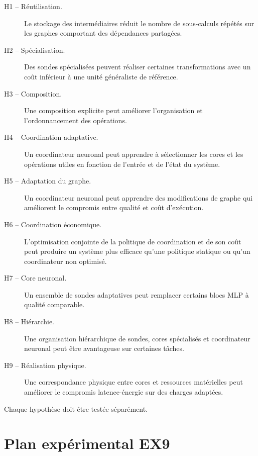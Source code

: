 \documentclass[11pt,a4paper]{article}
\begin{document}
\begin{description}

  \item[H1 -- Réutilisation.]
  Le stockage des intermédiaires réduit le nombre de sous-calculs
  répétés sur les graphes comportant des dépendances partagées.

  \item[H2 -- Spécialisation.]
  Des sondes spécialisées peuvent réaliser certaines transformations
  avec un coût inférieur à une unité généraliste de référence.

  \item[H3 -- Composition.]
  Une composition explicite peut améliorer l'organisation et
  l'ordonnancement des opérations.

  \item[H4 -- Coordination adaptative.]
  Un coordinateur neuronal peut apprendre à sélectionner les cores
  et les opérations utiles en fonction de l'entrée et de l'état
  du système.

  \item[H5 -- Adaptation du graphe.]
  Un coordinateur neuronal peut apprendre des modifications de
  graphe qui améliorent le compromis entre qualité et coût
  d'exécution.

  \item[H6 -- Coordination économique.]
  L'optimisation conjointe de la politique de coordination et de
  son coût peut produire un système plus efficace qu'une politique
  statique ou qu'un coordinateur non optimisé.

  \item[H7 -- Core neuronal.]
  Un ensemble de sondes adaptatives peut remplacer certains blocs
  MLP à qualité comparable.

  \item[H8 -- Hiérarchie.]
  Une organisation hiérarchique de sondes, cores spécialisés et
  coordinateur neuronal peut être avantageuse sur certaines tâches.

  \item[H9 -- Réalisation physique.]
  Une correspondance physique entre cores et ressources matérielles
  peut améliorer le compromis latence-énergie sur des charges adaptées.

\end{description}

Chaque hypothèse doit être testée séparément.

\section{Plan expérimental EX9}
\end{document}
